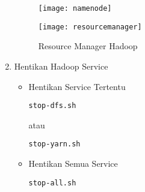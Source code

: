 \documentclass[a4paper]{tufte-handout}
\begin{document}
\begin{enumerate}
\begin{figure}[!ht]
\texttt{[image: namenode]}
\label{gam:namenode}
\end{figure}
\vspace*{-.7cm}
\begin{figure}[!ht]
\texttt{[image: resourcemanager]}
\caption{Resource Manager Hadoop}
\label{gam:resourcemanager}
\end{figure}

\vspace*{-.7cm}
\item Hentikan Hadoop Service
\begin{itemize}
\item Hentikan Service Tertentu
\begin{lstlisting}[language=Terminal]
 stop-dfs.sh
\end{lstlisting} 
atau
\begin{lstlisting}[language=Terminal]
 stop-yarn.sh
\end{lstlisting}
 
\item Hentikan Semua Service
\begin{lstlisting}[language=Terminal]
 stop-all.sh
\end{lstlisting}
\end{itemize}
\end{enumerate}

\vspace*{.1cm}
\hrulefill
\end{document}
